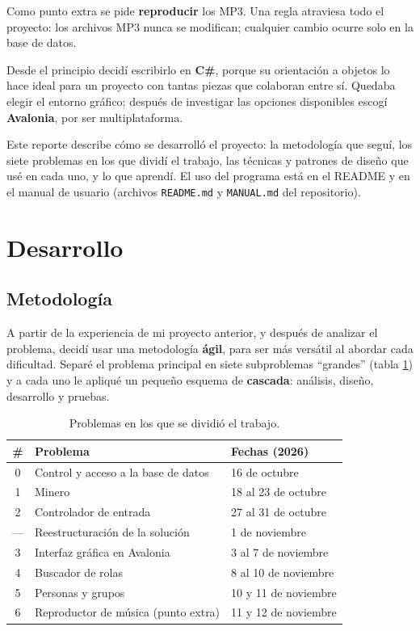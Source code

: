 \documentclass{article}
\begin{document}
Como punto extra se pide \textbf{reproducir} los MP3. Una regla atraviesa
todo el proyecto: los archivos MP3 nunca se modifican; cualquier cambio
ocurre solo en la base de datos.

Desde el principio decidí escribirlo en \textbf{C\#}, porque su orientación
a objetos lo hace ideal para un proyecto con tantas piezas que colaboran
entre sí. Quedaba elegir el entorno gráfico; después de investigar las
opciones disponibles escogí \textbf{Avalonia}, por ser multiplataforma.

Este reporte describe cómo se desarrolló el proyecto: la metodología que
seguí, los siete problemas en los que dividí el trabajo, las técnicas y
patrones de diseño que usé en cada uno, y lo que aprendí. El uso del programa
está en el README y en el manual de usuario (archivos \texttt{README.md} y
\texttt{MANUAL.md} del repositorio).

\section{Desarrollo}

\subsection{Metodología}

A partir de la experiencia de mi proyecto anterior, y después de analizar el
problema, decidí usar una metodología \textbf{ágil}, para ser más versátil al
abordar cada dificultad. Separé el problema principal en siete subproblemas
``grandes'' (tabla \ref{tab:problemas}) y a cada uno le apliqué un pequeño
esquema de \textbf{cascada}: análisis, diseño, desarrollo y pruebas.

\begin{table}[htbp]
	\centering
	\begin{tabular}{cll}
		\toprule
		\textbf{\#} & \textbf{Problema} & \textbf{Fechas (2026)} \\
		\midrule
		0 & Control y acceso a la base de datos & 16 de octubre \\
		1 & Minero & 18 al 23 de octubre \\
		2 & Controlador de entrada & 27 al 31 de octubre \\
		--- & Reestructuración de la solución & 1 de noviembre \\
		3 & Interfaz gráfica en Avalonia & 3 al 7 de noviembre \\
		4 & Buscador de rolas & 8 al 10 de noviembre \\
		5 & Personas y grupos & 10 y 11 de noviembre \\
		6 & Reproductor de música (punto extra) & 11 y 12 de noviembre \\
		\bottomrule
	\end{tabular}
	\caption{Problemas en los que se dividió el trabajo.}
	\label{tab:problemas}
\end{table}
\end{document}
